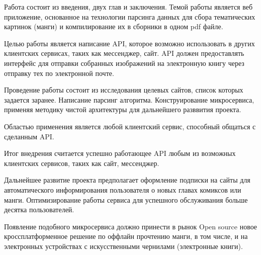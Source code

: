 \abstract %


Работа состоит из введения, двух глав и заключения. 
Темой работы является веб приложение, основанное на технологии парсинга данных для сбора тематических картинок (манги) и компилирование их в сборники в одном pdf файле.

Целью работы является написание API, которое возможно использовать в других клиентских сервисах, таких как мессенджер, сайт.
API должен предоставлять интерфейс для отправки собранных изображений на электронную книгу через отправку тех по электронной почте.

Проведение работы состоит из исследования целевых сайтов, список которых задается заранее. 
Написание парсинг алгоритма. Конструирование микросервиса, применяя методику чистой архитектуры для дальнейшего разввития проекта.

Областью применения является любой клиентский сервис, способный общаться с сделанным API.

Итог внедрения считается успешно работающее API любым из возможных клиентских сервисов, таких как сайт, мессенджер.

Дальнейшее развитие проекта предполагает оформление подписки на сайты для автоматического информирования пользователя о новых главах комиксов или манги.
Оптимизирование работы сервиса для успешного обслуживания больше десятка пользователей.

Появление подобного микросервиса должно принести в рынок Open source новое кроссплатформенное решение по оффлайн прочтению манги, в том числе, и на электронных устройствах с искусственными чернилами (электронные книги).